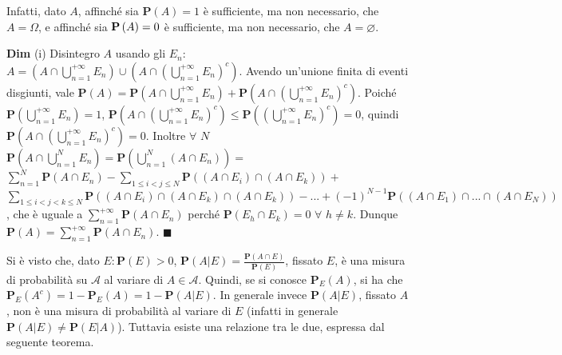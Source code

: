 \documentclass{article}
\begin{document}
Infatti, dato $A$, affinch\'{e} sia $\mathbf{P}\left( A\right) =1$ \`{e}
sufficiente, ma non necessario, che $A=\Omega $, e affinch\'{e} sia $\mathbf{%
P}\left( A\right) =0$ \`{e} sufficiente, ma non necessario, che $%
A=\varnothing $.

\textbf{Dim} (i) Disintegro $A$ usando gli $E_{n}$: $A=\left( A\cap
\bigcup_{n=1}^{+\infty }E_{n}\right) \cup \left( A\cap \left(
\bigcup_{n=1}^{+\infty }E_{n}\right) ^{c}\right) $. Avendo un'unione finita
di eventi disgiunti, vale $\mathbf{P}\left( A\right) =\mathbf{P}\left( A\cap
\bigcup_{n=1}^{+\infty }E_{n}\right) +\mathbf{P}\left( A\cap \left(
\bigcup_{n=1}^{+\infty }E_{n}\right) ^{c}\right) $. Poich\'{e} $\mathbf{P}%
\left( \bigcup_{n=1}^{+\infty }E_{n}\right) =1$, $\mathbf{P}\left( A\cap
\left( \bigcup_{n=1}^{+\infty }E_{n}\right) ^{c}\right) \leq \mathbf{P}%
\left( \left( \bigcup_{n=1}^{+\infty }E_{n}\right) ^{c}\right) =0$, quindi $%
\mathbf{P}\left( A\cap \left( \bigcup_{n=1}^{+\infty }E_{n}\right)
^{c}\right) =0$. Inoltre $\forall $ $N$ $\mathbf{P}\left( A\cap
\bigcup_{n=1}^{N}E_{n}\right) =\mathbf{P}\left( \bigcup_{n=1}^{N}\left(
A\cap E_{n}\right) \right) =$ $\sum_{n=1}^{N}\mathbf{P}\left( A\cap
E_{n}\right) -\sum_{1\leq i<j\leq N}\mathbf{P}\left( \left( A\cap
E_{i}\right) \cap \left( A\cap E_{k}\right) \right) +$ $\sum_{1\leq
i<j<k\leq N}\mathbf{P}\left( \left( A\cap E_{i}\right) \cap \left( A\cap
E_{k}\right) \cap \left( A\cap E_{k}\right) \right) -...+\left( -1\right)
^{N-1}\mathbf{P}\left( \left( A\cap E_{1}\right) \cap ...\cap \left( A\cap
E_{N}\right) \right) $, che \`{e} uguale a $\sum_{n=1}^{+\infty }\mathbf{P}%
\left( A\cap E_{n}\right) $ perch\'{e} $\mathbf{P}\left( E_{h}\cap
E_{k}\right) =0$ $\forall $ $h\neq k$. Dunque $\mathbf{P}\left( A\right)
=\sum_{n=1}^{+\infty }\mathbf{P}\left( A\cap E_{n}\right) $. $\blacksquare $

Si \`{e} visto che, dato $E:\mathbf{P}\left( E\right) >0$, $\mathbf{P}\left(
A|E\right) =\frac{\mathbf{P}\left( A\cap E\right) }{\mathbf{P}\left(
E\right) }$, fissato $E$, \`{e} una misura di probabilit\`{a} su $\mathcal{A}
$ al variare di $A\in \mathcal{A}$. Quindi, se si conosce $\mathbf{P}%
_{E}\left( A\right) $, si ha che $\mathbf{P}_{E}\left( A^{c}\right) =1-%
\mathbf{P}_{E}\left( A\right) =1-\mathbf{P}\left( A|E\right) $. In generale
invece $\mathbf{P}\left( A|E\right) $, fissato $A$, non \`{e} una misura di
probabilit\`{a} al variare di $E$ (infatti in generale $\mathbf{P}\left(
A|E\right) \neq \mathbf{P}\left( E|A\right) $). Tuttavia esiste una
relazione tra le due, espressa dal seguente teorema.
\end{document}
